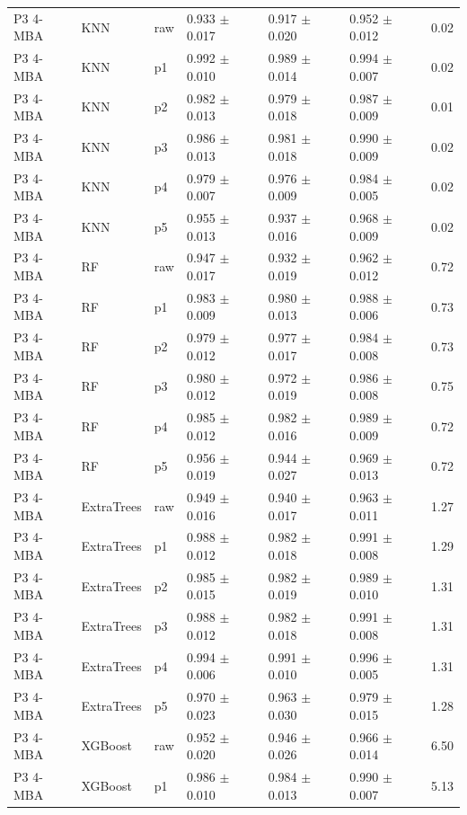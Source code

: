 {\begin{longtable}{L{2.35cm}L{2.4cm}L{1.0cm}L{2.35cm}L{2.25cm}L{2.25cm}L{1.45cm}}
P3 4-MBA & KNN & raw & 0.933 $\pm$ 0.017 & 0.917 $\pm$ 0.020 & 0.952 $\pm$ 0.012 & 0.02 \\
P3 4-MBA & KNN & p1 & 0.992 $\pm$ 0.010 & 0.989 $\pm$ 0.014 & 0.994 $\pm$ 0.007 & 0.02 \\
P3 4-MBA & KNN & p2 & 0.982 $\pm$ 0.013 & 0.979 $\pm$ 0.018 & 0.987 $\pm$ 0.009 & 0.01 \\
P3 4-MBA & KNN & p3 & 0.986 $\pm$ 0.013 & 0.981 $\pm$ 0.018 & 0.990 $\pm$ 0.009 & 0.02 \\
P3 4-MBA & KNN & p4 & 0.979 $\pm$ 0.007 & 0.976 $\pm$ 0.009 & 0.984 $\pm$ 0.005 & 0.02 \\
P3 4-MBA & KNN & p5 & 0.955 $\pm$ 0.013 & 0.937 $\pm$ 0.016 & 0.968 $\pm$ 0.009 & 0.02 \\
P3 4-MBA & RF & raw & 0.947 $\pm$ 0.017 & 0.932 $\pm$ 0.019 & 0.962 $\pm$ 0.012 & 0.72 \\
P3 4-MBA & RF & p1 & 0.983 $\pm$ 0.009 & 0.980 $\pm$ 0.013 & 0.988 $\pm$ 0.006 & 0.73 \\
P3 4-MBA & RF & p2 & 0.979 $\pm$ 0.012 & 0.977 $\pm$ 0.017 & 0.984 $\pm$ 0.008 & 0.73 \\
P3 4-MBA & RF & p3 & 0.980 $\pm$ 0.012 & 0.972 $\pm$ 0.019 & 0.986 $\pm$ 0.008 & 0.75 \\
P3 4-MBA & RF & p4 & 0.985 $\pm$ 0.012 & 0.982 $\pm$ 0.016 & 0.989 $\pm$ 0.009 & 0.72 \\
P3 4-MBA & RF & p5 & 0.956 $\pm$ 0.019 & 0.944 $\pm$ 0.027 & 0.969 $\pm$ 0.013 & 0.72 \\
P3 4-MBA & ExtraTrees & raw & 0.949 $\pm$ 0.016 & 0.940 $\pm$ 0.017 & 0.963 $\pm$ 0.011 & 1.27 \\
P3 4-MBA & ExtraTrees & p1 & 0.988 $\pm$ 0.012 & 0.982 $\pm$ 0.018 & 0.991 $\pm$ 0.008 & 1.29 \\
P3 4-MBA & ExtraTrees & p2 & 0.985 $\pm$ 0.015 & 0.982 $\pm$ 0.019 & 0.989 $\pm$ 0.010 & 1.31 \\
P3 4-MBA & ExtraTrees & p3 & 0.988 $\pm$ 0.012 & 0.982 $\pm$ 0.018 & 0.991 $\pm$ 0.008 & 1.31 \\
P3 4-MBA & ExtraTrees & p4 & 0.994 $\pm$ 0.006 & 0.991 $\pm$ 0.010 & 0.996 $\pm$ 0.005 & 1.31 \\
P3 4-MBA & ExtraTrees & p5 & 0.970 $\pm$ 0.023 & 0.963 $\pm$ 0.030 & 0.979 $\pm$ 0.015 & 1.28 \\
P3 4-MBA & XGBoost & raw & 0.952 $\pm$ 0.020 & 0.946 $\pm$ 0.026 & 0.966 $\pm$ 0.014 & 6.50 \\
P3 4-MBA & XGBoost & p1 & 0.986 $\pm$ 0.010 & 0.984 $\pm$ 0.013 & 0.990 $\pm$ 0.007 & 5.13 \\

\end{longtable}}
